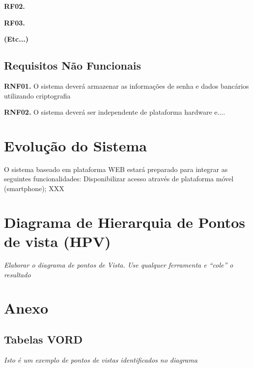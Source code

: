 \documentclass[12pt,twoside,a4paper]{article}
\begin{document}
\textbf{RF02. }

\textbf{RF03.} 

\textbf{(Etc...)}

 


\subsection{Requisitos Não Funcionais}

\textbf{RNF01.} O sistema deverá armazenar as informações de senha e dados bancários utilizando criptografia

\textbf{RNF02.} O sistema deverá ser independente de plataforma hardware e....

\section{Evolução do Sistema}

O sistema baseado em plataforma WEB estará preparado para integrar as seguintes funcionalidades:
Disponibilizar acesso através de plataforma móvel (smartphone);
XXX



\section{Diagrama de Hierarquia de Pontos de vista (HPV)}

\textit{Elaborar o diagrama de pontos de Vista.  Use qualquer ferramenta e “cole” o resultado}

\newpage

\section{Anexo}
\subsection{Tabelas VORD}

\textit{Isto é um exemplo de  pontos de vistas   identificados no diagrama}
\end{document}
